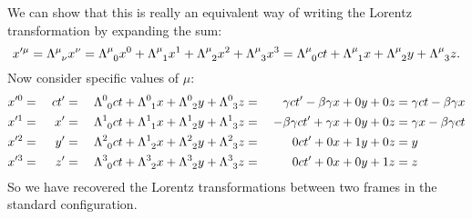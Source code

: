 \documentclass[fleqn]{NotesClass}
\begin{document}
    We can show that this is really an equivalent way of writing the Lorentz transformation by expanding the sum:
    \begin{equation}
        x'^\mu = \tensor{\Lambda}{^\mu_\nu}x^\nu = \tensor{\Lambda}{^\mu_0}x^0 + \tensor{\Lambda}{^\mu_1}x^1 + \tensor{\Lambda}{^\mu_2}x^2 + \tensor{\Lambda}{^\mu_3}x^3 = \tensor{\Lambda}{^\mu_0} ct + \tensor{\Lambda}{^\mu_1} x + \tensor{\Lambda}{^\mu_2} y + \tensor{\Lambda}{^\mu_3} z.
    \end{equation}
    Now consider specific values of \(\mu\):
    \begin{alignat*}{9}
        x'^0 &{}={}& ct' &{}={}& \tensor{\Lambda}{^0_0}ct + \tensor{\Lambda}{^0_1}x + \tensor{\Lambda}{^0_2}y + \tensor{\Lambda}{^0_3}z &{}={}& \gamma ct' - \beta\gamma x + 0y + 0z &{}= \gamma ct - \beta \gamma x\\
        x'^1 &{}={}& x' &{}={}& \tensor{\Lambda}{^1_0}ct + \tensor{\Lambda}{^1_1}x + \tensor{\Lambda}{^1_2}y + \tensor{\Lambda}{^1_3}z &{}=& -\beta\gamma ct' + \gamma x + 0y + 0z &{}= \gamma x - \beta \gamma ct\\
        x'^2 &{}={}& y' &{}={}& \tensor{\Lambda}{^2_0}ct + \tensor{\Lambda}{^1_2}x + \tensor{\Lambda}{^2_2}y + \tensor{\Lambda}{^2_3}z &{}={}& 0 ct' + 0x + 1y + 0z &{}={} y\\
        x'^3 &{}={}& z' &{}={}& \tensor{\Lambda}{^3_0}ct + \tensor{\Lambda}{^3_2}x + \tensor{\Lambda}{^3_2}y + \tensor{\Lambda}{^3_3}z &{}={}& 0 ct' + 0x + 0y + 1z &{}={} z\\
    \end{alignat*}
    So we have recovered the Lorentz transformations between two frames in the standard configuration.
    
\end{document}
